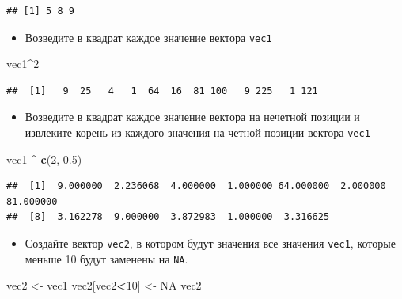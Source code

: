 \documentclass[]{book}
\newenvironment{Shaded}{\begin{snugshade}}{\end{snugshade}}
\newcommand{\KeywordTok}[1]{\textcolor[rgb]{0.13,0.29,0.53}{\textbf{#1}}}
\newcommand{\DecValTok}[1]{\textcolor[rgb]{0.00,0.00,0.81}{#1}}
\newcommand{\FloatTok}[1]{\textcolor[rgb]{0.00,0.00,0.81}{#1}}
\newcommand{\StringTok}[1]{\textcolor[rgb]{0.31,0.60,0.02}{#1}}
\newcommand{\OtherTok}[1]{\textcolor[rgb]{0.56,0.35,0.01}{#1}}
\newcommand{\OperatorTok}[1]{\textcolor[rgb]{0.81,0.36,0.00}{\textbf{#1}}}
\newcommand{\NormalTok}[1]{#1}
\providecommand{\tightlist}{%
  \setlength{\itemsep}{0pt}\setlength{\parskip}{0pt}}
\begin{document}
\begin{verbatim}
## [1] 5 8 9
\end{verbatim}

\begin{itemize}
\tightlist
\item
  Возведите в квадрат каждое значение вектора \texttt{vec1}
\end{itemize}

\begin{Shaded}
\begin{Highlighting}[]
\NormalTok{vec1}\OperatorTok{^}\DecValTok{2}
\end{Highlighting}
\end{Shaded}

\begin{verbatim}
##  [1]   9  25   4   1  64  16  81 100   9 225   1 121
\end{verbatim}

\begin{itemize}
\tightlist
\item
  Возведите в квадрат каждое значение вектора на нечетной позиции и
  извлеките корень из каждого значения на четной позиции вектора
  \texttt{vec1}
\end{itemize}

\begin{Shaded}
\begin{Highlighting}[]
\NormalTok{vec1 }\OperatorTok{^}\StringTok{ }\KeywordTok{c}\NormalTok{(}\DecValTok{2}\NormalTok{, }\FloatTok{0.5}\NormalTok{)}
\end{Highlighting}
\end{Shaded}

\begin{verbatim}
##  [1]  9.000000  2.236068  4.000000  1.000000 64.000000  2.000000 81.000000
##  [8]  3.162278  9.000000  3.872983  1.000000  3.316625
\end{verbatim}

\begin{itemize}
\tightlist
\item
  Создайте вектор \texttt{vec2}, в котором будут значения все значения
  \texttt{vec1}, которые меньше 10 будут заменены на \texttt{NA}.
\end{itemize}

\begin{Shaded}
\begin{Highlighting}[]
\NormalTok{vec2 <-}\StringTok{ }\NormalTok{vec1}
\NormalTok{vec2[vec2}\OperatorTok{<}\DecValTok{10}\NormalTok{] <-}\StringTok{ }\OtherTok{NA}
\NormalTok{vec2}
\end{Highlighting}
\end{Shaded}
\end{document}
